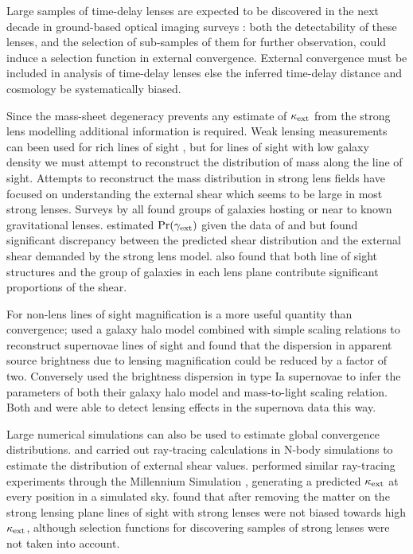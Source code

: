 \documentclass[useAMS,usenatbib,a4paper]{mn2e}
\begin{document}
Large samples
of time-delay lenses are expected to be discovered in the next decade in
ground-based optical imaging surveys \citep{Oguri+Marshall2010}: both
the detectability of these lenses, and the selection of sub-samples of
them for further observation, could induce a selection function in external
convergence. External convergence must be included in analysis of time-delay
lenses else the inferred time-delay distance and cosmology be systematically biased.

Since the mass-sheet degeneracy prevents any estimate of $\kappa_{\rm ext}$ from the 
strong lens modelling additional information is required. Weak lensing measurements
can been used for rich lines of sight \citep{NakajimaEtal2009, FadelyEtal2009}, but 
for lines of sight with low galaxy density we must attempt to reconstruct the distribution
of mass along the line of sight. Attempts to reconstruct the mass distribution in strong
lens fields have focused on understanding the external shear which seems to be large in most strong lenses.
Surveys by \citet{Fassnacht+Lubin2002,AugerEtal2007,WilliamsEtal2006,MomchevaEtal2006}
all found groups of galaxies hosting or near to known gravitational lenses.
\citet{WongEtal2011} estimated $\Pr(\gamma_{\rm ext})$ given the data of \citet{WilliamsEtal2006}
and \citet{MomchevaEtal2006} but found significant discrepancy between the predicted shear
distribution and the external shear demanded by the strong lens model. 
\citeauthor{WongEtal2011} also found that both line of
sight structures and the group of galaxies in each lens plane contribute
significant proportions of the shear. 

For non-lens lines of sight magnification is a more useful quantity than convergence; \citet{GunnarssonEtal2006} used a galaxy halo model combined with simple scaling relations to reconstruct supernovae
lines of sight and found that the dispersion in
apparent source brightness due to lensing magnification could be reduced
by a factor of two. Conversely \citet{KarpenkaEtal2012} used the brightness dispersion in type Ia supernovae to infer the parameters of both their galaxy halo model and mass-to-light scaling relation. Both \citeauthor{KarpenkaEtal2012} and \citet{JonssonEtal2010} were able to 
detect lensing effects in the supernova data this way.

Large numerical simulations can also be used to estimate global convergence distributions.
 \citet{Holder+Schechter2003} and
\citet{DalalEtal2005} carried out ray-tracing calculations in N-body
simulations to estimate the distribution of external shear values. 
\citet{HilbertEtal2009} performed similar ray-tracing experiments
through the Millennium Simulation \citep{SpringelEtal2005}, generating a
predicted $\kappa_{\rm ext}$ at every position in a simulated sky.
\citet{HilbertEtal2009} found that after removing the matter on the strong lensing plane
\MS lines of sight with strong lenses
were not biased towards high $\kappa_{\rm ext}$, although selection functions for
discovering samples of strong lenses were not taken
into account.
\end{document}
